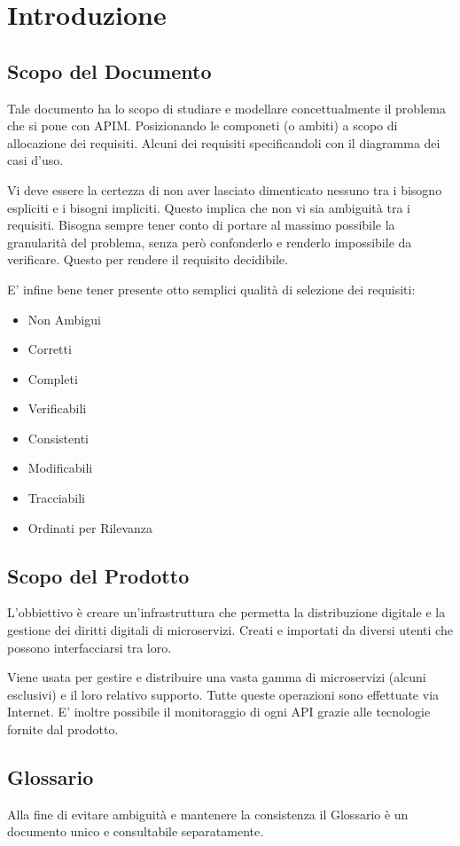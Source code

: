 \documentclass[12pt,a4paper,titlepage]{article}
\begin{document}
	
	
	\section{Introduzione}
	\subsection{Scopo del Documento}
	Tale documento ha lo scopo di studiare e modellare concettualmente il problema che si pone con APIM. Posizionando le componeti (o ambiti) a scopo di allocazione dei requisiti. Alcuni dei requisiti specificandoli con il diagramma dei casi d'uso.
	
	Vi deve essere la certezza di non aver lasciato dimenticato nessuno tra i bisogno espliciti e i bisogni impliciti. Questo implica che non vi sia ambiguità tra i requisiti.
	Bisogna sempre tener conto di portare al massimo possibile la granularità del problema, senza però confonderlo e renderlo impossibile da verificare. Questo per rendere il requisito decidibile.
	
	E' infine bene tener presente otto semplici qualità di selezione dei requisiti:
	\begin{itemize}
		\item Non Ambigui
		\item Corretti
		\item Completi
		\item Verificabili
		\item Consistenti
		\item Modificabili
		\item Tracciabili
		\item Ordinati per Rilevanza
	\end{itemize}
	\subsection{Scopo del Prodotto}
	L'obbiettivo è creare un'infrastruttura che permetta la distribuzione digitale e la gestione dei diritti digitali di microservizi. Creati e importati da diversi utenti che possono interfacciarsi tra loro.
	
	Viene usata per gestire e distribuire una vasta gamma di microservizi (alcuni esclusivi) e il loro relativo supporto. Tutte queste operazioni sono effettuate via Internet.
	E' inoltre possibile il monitoraggio di ogni API grazie alle tecnologie fornite dal prodotto. 
	\subsection{Glossario}
	Alla fine di evitare ambiguità e mantenere la consistenza il Glossario è un documento unico e consultabile separatamente.
	
\end{document}
